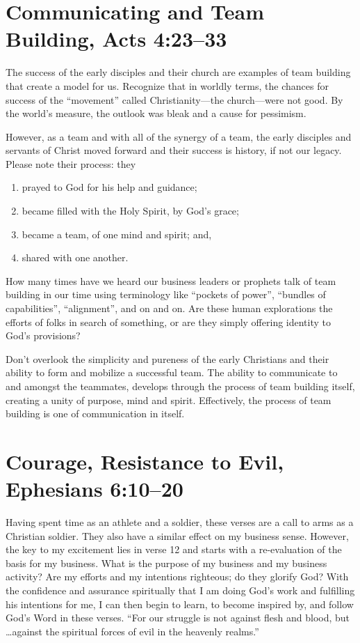 \documentclass[12pt]{memoir}
\begin{document}
\section[Communicating and Team Building]{Communicating and Team Building, Acts 4:23--33}

The success of the early disciples and their church are examples of
team building that create a model for us. Recognize that in worldly
terms, the chances for success of the ``movement'' called Christianity---the
church---were not good. By the world's measure, the outlook was bleak
and a cause for pessimism.

However, as a team and with all of the synergy of a team, the early
disciples and servants of Christ moved forward and their success is
history, if not our legacy. Please note their process: they 
\begin{enumerate}
\item prayed to God for his help and guidance; 
\item became filled with the Holy Spirit, by God's grace; 
\item became a team, of one mind and spirit; and, 
\item shared with one another. 
\end{enumerate}
How many times have we heard our business leaders or prophets talk
of team building in our time using terminology like ``pockets of
power'', ``bundles of capabilities'', ``alignment'', and on and
on. Are these human explorations the efforts of folks in search of
something, or are they simply offering identity to God's provisions?

Don't overlook the simplicity and pureness of the early Christians
and their ability to form and mobilize a successful team. The ability
to communicate to and amongst the teammates, develops through the
process of team building itself, creating a unity of purpose, mind
and spirit. Effectively, the process of team building is one of communication
in itself.

\section[Courage, Resistance to Evil]{Courage, Resistance to Evil, Ephesians 6:10--20}

Having spent time as an athlete and a soldier, these verses are a
call to arms as a Christian soldier. They also have a similar effect
on my business sense. However, the key to my excitement lies in verse 12 and starts with a re-evaluation of the basis for my business. What
is the purpose of my business and my business activity? Are my efforts
and my intentions righteous; do they glorify God? With the confidence
and assurance spiritually that I am doing God's work and fulfilling
his intentions for me, I can then begin to learn, to become inspired
by, and follow God's Word in these verses. ``For our struggle is
not against flesh and blood, but \dots against the spiritual forces
of evil in the heavenly realms.''
\end{document}
